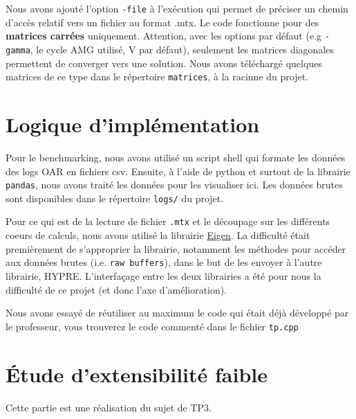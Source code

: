 \documentclass[10pt,twocolumn,letterpaper]{article}
\def\code#1{\texttt{#1}}
\begin{document}
Nous avons ajouté l'option \code{-file} à l'exécution qui permet de préciser
un chemin d'accès relatif vers un fichier au format .mtx. Le code fonctionne
pour des \textbf{matrices carrées} uniquement. Attention, avec les options par 
défaut (e.g \code{-gamma}, le cycle AMG utilisé, V par défaut), seulement les
matrices diagonales permettent de converger vers une solution. Nous avons 
téléchargé quelques matrices de ce type dans le répertoire \code{matrices}, 
à la racinne du projet.

\section{Logique d'implémentation}

Pour le benchmarking, nous avons utilisé un script shell qui formate les données
des logs OAR en fichiers csv.
Ensuite, à l'aide de python et surtout de la librairie \code{pandas}, nous avons
traité les données pour les visualiser ici.
Les données brutes sont disponibles dans le répertoire \code{logs/} du projet.

Pour ce qui est de la lecture de fichier \code{.mtx} et le découpage sur les
différents coeurs de calculs, nous avons utilisé la librairie
\href{https://eigen.tuxfamily.org/index.php?title=Main_Page}{Eigen}.
La difficulté était premièrement de s'approprier la librairie, notamment les
méthodes pour accéder aux données brutes (i.e. \code{raw buffers}), dans le but
de les envoyer à l'autre librairie, HYPRE. L'interfaçage entre les deux
librairies a été pour nous la difficulté de ce projet (et donc l'axe
d'amélioration).

Nous avons essayé de réutiliser au maximum le code qui était déjà développé par
le professeur, vous trouverez le code commenté dans le fichier \code{tp.cpp}

\section{Étude d'extensibilité faible}

Cette partie est une réalisation du sujet de TP3.

\end{document}
